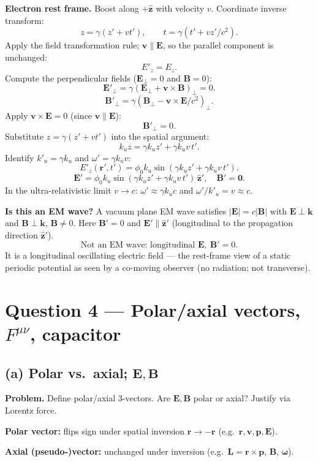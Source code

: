 \documentclass[11pt]{article}
\begin{document}
\textbf{Electron rest frame.} Boost along $+\hat{\bm z}$ with velocity $v$. Coordinate inverse transform:
\[ z = \gamma(z'+vt'),\qquad t = \gamma(t'+vz'/c^2). \]
Apply the field transformation rule; $\bm v\parallel\bm E$, so the parallel component is unchanged:
\[ E'_z = E_z. \]
Compute the perpendicular fields ($\bm E_\perp=0$ and $\bm B=0$):
\[ \bm E'_\perp = \gamma(\bm E_\perp + \bm v\times\bm B)_\perp = 0. \]
\[ \bm B'_\perp = \gamma(\bm B_\perp - \bm v\times\bm E/c^2)_\perp. \]
Apply $\bm v\times\bm E = 0$ (since $\bm v\parallel\bm E$):
\[ \bm B'_\perp = 0. \]
Substitute $z = \gamma(z'+vt')$ into the spatial argument:
\[ k_u z = \gamma k_u z' + \gamma k_u v\, t'. \]
Identify $k'_u = \gamma k_u$ and $\omega' = \gamma k_u v$:
\[ E'_z(\bm r',t') = \phi_0 k_u\sin(\gamma k_u z' + \gamma k_u v\,t'). \]
\[ \boxed{\;\bm E' = \phi_0 k_u \sin(\gamma k_u z' + \gamma k_u v\,t')\,\hat{\bm z}',\quad \bm B'=\bm 0.\;} \]
In the ultra-relativistic limit $v\to c$: $\omega'\approx \gamma k_u c$ and $\omega'/k'_u = v\approx c$.

\noindent\textbf{Is this an EM wave?} A vacuum plane EM wave satisfies $|\bm E|=c|\bm B|$ with $\bm E\perp\bm k$ and $\bm B\perp\bm k$, $\bm B\neq 0$. Here $\bm B'=0$ and $\bm E'\parallel\hat{\bm z}'$ (longitudinal to the propagation direction $\hat{\bm z}'$).
\[ \boxed{\;\text{Not an EM wave: longitudinal }\bm E,\ \bm B'=0.\;} \]
It is a longitudinal oscillating electric field --- the rest-frame view of a static periodic potential as seen by a co-moving observer (no radiation; not transverse).

\section*{Question 4 --- Polar/axial vectors, $F^{\mu\nu}$, capacitor}

\subsection*{(a) Polar vs.\ axial; $\bm E,\bm B$}

\textbf{Problem.} Define polar/axial 3-vectors. Are $\bm E,\bm B$ polar or axial? Justify via Lorentz force.

\textbf{Polar vector:} flips sign under spatial inversion $\bm r\to-\bm r$ (e.g.\ $\bm r,\bm v,\bm p,\bm E$).

\textbf{Axial (pseudo-)vector:} unchanged under inversion (e.g.\ $\bm L=\bm r\times\bm p$, $\bm B$, $\bm\omega$).
\end{document}
